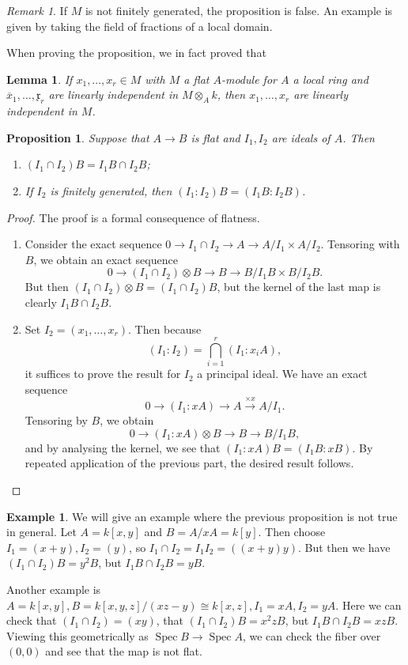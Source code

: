 \documentclass[leqno, openany]{memoir}
\newtheorem{prop}[thm]{Proposition}
\newtheorem{lem}[thm]{Lemma}
\theoremstyle{definition}
\newtheorem{exm}[thm]{Example}
\theoremstyle{remark}
\newtheorem{rmk}[thm]{Remark}
\theoremstyle{plain}
\theoremstyle{definition}
\theoremstyle{remark}
\newcommand{\mf}[1]{\mathfrak{#1}}
\newcommand{\ol}[1]{\overline{#1}}
\DeclareMathOperator{\Spec}{Spec}
\begin{document}
\begin{rmk} If $M$ is not finitely generated, the proposition is false. An
example is given by taking the field of fractions of a local domain.  \end{rmk}

When proving the proposition, we in fact proved that \begin{lem} If $x_1,
    \ldots, x_r \in M$ with $M$ a flat $A$-module for $A$ a local ring and
    $\ol{x}_1, \ldots, \mf{x}_r$ are linearly independent in $M \otimes_A k$,
    then $x_1, \ldots, x_r$ are linearly independent in $M$.  \end{lem}

\begin{prop} Suppose that $A \to B$ is flat and $I_1, I_2$ are ideals of $A$.
Then \begin{enumerate} \item $(I_1 \cap I_2)B = I_1 B \cap I_2 B$; \item If
$I_2$ is finitely generated, then $(I_1 : I_2)B = (I_1 B : I_2 B)$.
\end{enumerate} \end{prop}

\begin{proof} The proof is a formal consequence of flatness.  \begin{enumerate}
    \item Consider the exact sequence $0 \to I_1 \cap I_2 \to A \to A/I_1
        \times A/I_2$. Tensoring with $B$, we obtain an exact sequence \[ 0 \to
        (I_1 \cap I_2) \otimes B \to B \to B/I_1 B \times B/I_2 B. \] But then
        $(I_1 \cap I_2) \otimes B = (I_1 \cap I_2)B$, but the kernel of the
        last map is clearly $I_1 B \cap I_2 B$.  \item Set $I_2 = (x_1, \ldots,
        x_r)$. Then because \[ (I_1 : I_2) = \bigcap_{i=1}^r (I_1 : x_i A), \]
        it suffices to prove the result for $I_2$ a principal ideal. We have an
        exact sequence \[ 0 \to (I_1 : x A) \to A \xrightarrow{\times x} A/I_1.
        \] Tensoring by $B$, we obtain \[ 0 \to (I_1 : x A) \otimes B \to B \to
    B/I_1 B, \] and by analysing the kernel, we see that $(I_1: xA) B = (I_1 B:
    x B)$. By repeated application of the previous part, the desired result
    follows. \qedhere \end{enumerate} \end{proof}

\begin{exm} We will give an example where the previous proposition is not true
    in general. Let $A = k[x,y]$ and $B = A/xA = k[y]$. Then choose $I_1 =
    (x+y), I_2 = (y)$, so $I_1 \cap I_2 = I_1 I_2 = ( (x+y)y )$. But then we
    have $(I_1 \cap I_2) B = y^2 B$, but $I_1 B \cap I_2 B = yB$.

    Another example is $A = k[x,y], B = k[x,y,z]/(xz-y) \cong k[x,z], I_1 = xA,
I_2 = yA$. Here we can check that $(I_1 \cap I_2) = (xy)$, that $(I_1 \cap
I_2)B = x^2z B$, but $I_1 B \cap I_2 B = xz B$. Viewing this geometrically as
$\Spec B \to \Spec A$, we can check the fiber over $(0,0)$ and see that the map
is not flat.  \end{exm}
\end{document}
